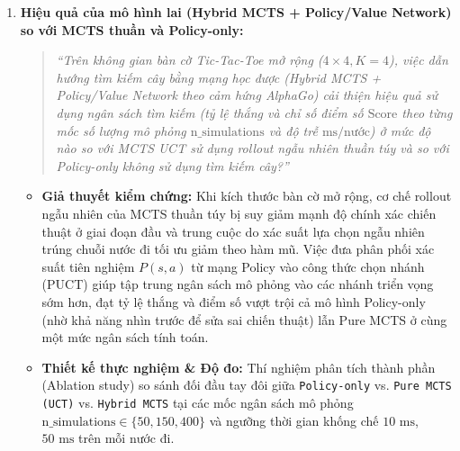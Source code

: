 \documentclass[a4paper,12pt]{report}
\begin{document}
\begin{enumerate}[label=\textbf{RQ\arabic*:}, leftmargin=1.5cm, start=1]
    \item \textbf{Hiệu quả của mô hình lai (Hybrid MCTS + Policy/Value Network) so với MCTS thuần và Policy-only:}
    \begin{quote}
        \textit{``Trên không gian bàn cờ Tic-Tac-Toe mở rộng ($4 \times 4, K=4$), việc dẫn hướng tìm kiếm cây bằng mạng học được (Hybrid MCTS + Policy/Value Network theo cảm hứng AlphaGo) cải thiện hiệu quả sử dụng ngân sách tìm kiếm (tỷ lệ thắng và chỉ số điểm số $\text{Score}$ theo từng mốc số lượng mô phỏng $\text{n\_simulations}$ và độ trễ $\text{ms/nước}$) ở mức độ nào so với MCTS UCT sử dụng rollout ngẫu nhiên thuần túy và so với Policy-only không sử dụng tìm kiếm cây?''}
    \end{quote}
    \begin{itemize}
        \item \textbf{Giả thuyết kiểm chứng:} Khi kích thước bàn cờ mở rộng, cơ chế rollout ngẫu nhiên của MCTS thuần túy bị suy giảm mạnh độ chính xác chiến thuật ở giai đoạn đầu và trung cuộc do xác suất lựa chọn ngẫu nhiên trúng chuỗi nước đi tối ưu giảm theo hàm mũ. Việc đưa phân phối xác suất tiên nghiệm $P(s, a)$ từ mạng Policy vào công thức chọn nhánh (PUCT) giúp tập trung ngân sách mô phỏng vào các nhánh triển vọng sớm hơn, đạt tỷ lệ thắng và điểm số vượt trội cả mô hình Policy-only (nhờ khả năng nhìn trước để sửa sai chiến thuật) lẫn Pure MCTS ở cùng một mức ngân sách tính toán.
        \item \textbf{Thiết kế thực nghiệm \& Độ đo:} Thí nghiệm phân tích thành phần (Ablation study) so sánh đối đầu tay đôi giữa \texttt{Policy-only} vs. \texttt{Pure MCTS (UCT)} vs. \texttt{Hybrid MCTS} tại các mốc ngân sách mô phỏng $\text{n\_simulations} \in \{50, 150, 400\}$ và ngưỡng thời gian khống chế $10\text{ ms}$, $50\text{ ms}$ trên mỗi nước đi.
    \end{itemize}


\end{enumerate}
\end{document}
